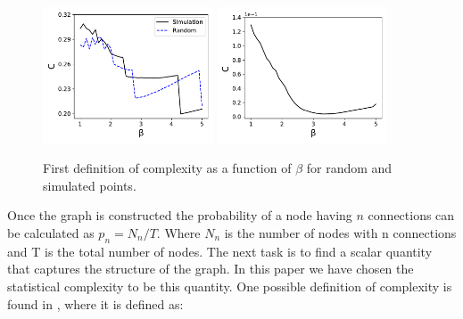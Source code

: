 \documentclass[fleqn,usenatbib]{mnras}
\begin{document}
\begin{figure}
    \centering
    \includegraphics[width=0.45\textwidth]{cvb_viejo.pdf}
    \includegraphics[width=0.45\textwidth]{cvb_inicial.pdf}
    \caption{First definition of complexity as a function of $\beta$
      for random and simulated points.} 
    \label{fig:cvb_viejo} 
\end{figure}

Once the graph is constructed the probability of a node having $n$
connections can be calculated as $p_n=N_{n}/T$. Where $N_{n}$ is the
number of nodes with n connections and T is the total number of
nodes. The next task is to find a scalar quantity that captures the
structure of the graph. In this paper we have chosen the statistical
complexity to be this quantity. One possible definition of complexity
is found in \cite{lopez_comp}, where it is defined as: 
\end{document}
